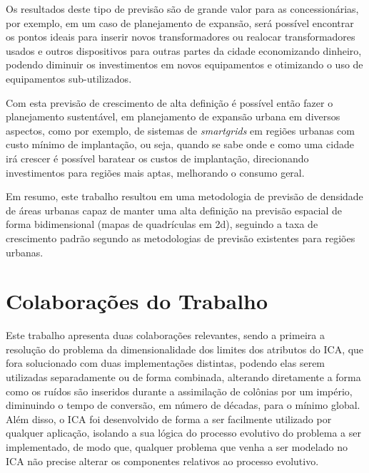 Os resultados deste tipo de previsão são de grande valor para as concessionárias, por exemplo, em um caso de planejamento de expansão, será possível encontrar os pontos ideais para inserir novos transformadores ou realocar transformadores usados e outros dispositivos para outras partes da cidade economizando dinheiro, podendo diminuir os investimentos em novos equipamentos e otimizando o uso de equipamentos sub-utilizados.

Com esta previsão de crescimento de alta definição é possível então fazer o planejamento sustentável, em planejamento de expansão urbana em diversos aspectos, como por exemplo, de sistemas de \emph{smartgrids} em regiões urbanas com custo mínimo de implantação, ou seja, quando se sabe onde e como uma cidade irá crescer é possível baratear os custos de implantação, direcionando investimentos para regiões mais aptas, melhorando o consumo geral.

Em resumo, este trabalho resultou em uma metodologia de previsão de densidade de áreas urbanas capaz de manter uma alta definição na previsão espacial de forma bidimensional (mapas de quadrículas em 2d),  seguindo a taxa de crescimento padrão segundo as metodologias de previsão existentes para regiões urbanas.


\section{Colaborações do Trabalho}
\label{colaborações_do_trabalho}


Este trabalho apresenta duas colaborações relevantes, sendo a primeira a resolução do problema da dimensionalidade dos limites dos atributos do ICA, que fora solucionado com duas implementações distintas, podendo elas serem utilizadas separadamente ou de forma combinada, alterando diretamente a forma como os ruídos são inseridos durante a assimilação de colônias por um império, diminuindo o tempo de conversão, em número de décadas, para o mínimo global. Além disso, o ICA foi desenvolvido de forma a ser facilmente utilizado por qualquer aplicação, isolando a sua lógica do processo evolutivo do problema a ser implementado, de modo que, qualquer problema que venha a ser modelado no ICA não precise alterar os componentes relativos ao processo evolutivo. 

